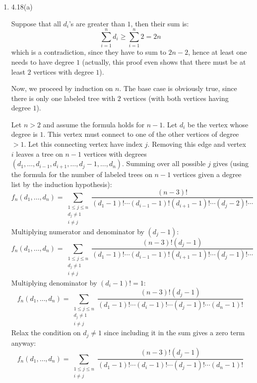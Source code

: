 \begin{solution}
    \begin{enumerate}[label=(\alph*)]
        \item \hypertarget{eq:ch4:18:a}{4.18(a)} Suppose that all $d_i$'s are greater than $1$, then their sum is:
        \[
            \sum_{i=1}^n d_i \geq \sum_{i=1}^n 2 = 2n
        \]
        which is a contradiction, since they have to sum to $2n-2$, hence at least one needs to have degree $1$ (actually, this proof even shows that there must be at least $2$ vertices with degree $1$).

        Now, we proceed by induction on $n$. The base case is obviously true, since there is only one labeled tree with $2$ vertices (with both vertices having degree $1$). 

        Let $n>2$ and assume the formula holds for $n-1$. Let $d_i$ be the vertex whose degree is $1$. This vertex must connect to one of the other vertices of degree $>1$. Let this connecting vertex have index $j$. Removing this edge and vertex $i$ leaves a tree on $n-1$ vertices with degrees $(d_1, \ldots, d_{i-1}, d_{i+1}, \ldots, d_j - 1, \ldots, d_n)$. Summing over all possible $j$ gives (using the formula for the number of labeled trees on $n-1$ vertices given a degree list by the induction hypothesis):
        \[
            f_n(d_1,\ldots,d_n) = \sum_{\substack{1\leq j\leq n \\ d_j \neq 1 \\ i \neq j}} \frac{(n-3)!}{(d_1-1)!\cdots (d_{i-1} - 1)! (d_{i+1} -1)!\cdots (d_j - 2)! \cdots}
        \]
        Multiplying numerator and denominator by $(d_j-1)$:
        \[
            f_n(d_1,\ldots,d_n) = \sum_{\substack{1\leq j\leq n \\ d_j \neq 1 \\ i \neq j}} \frac{(n-3)!(d_j-1)}{(d_1-1)!\cdots (d_{i-1} - 1)! (d_{i+1} -1)!\cdots (d_j - 1)! \cdots}
        \]
        Multiplying denominator by $(d_i-1)! = 1$:
        \[
            f_n(d_1,\ldots,d_n) = \sum_{\substack{1\leq j\leq n \\ d_j \neq 1 \\ i \neq j}} \frac{(n-3)!(d_j-1)}{(d_1-1)!\cdots (d_{i} - 1)!\cdots (d_j - 1)! \cdots (d_n-1)!}
        \]
        Relax the condition on $d_j\neq 1$ since including it in the sum gives a zero term anyway:
        \[
            f_n(d_1,\ldots,d_n) = \sum_{\substack{1\leq j\leq n \\ i \neq j}} \frac{(n-3)!(d_j-1)}{(d_1-1)!\cdots (d_{i} - 1)!\cdots (d_j - 1)! \cdots (d_n-1)!} 
\]
\end{enumerate}
\end{solution}
